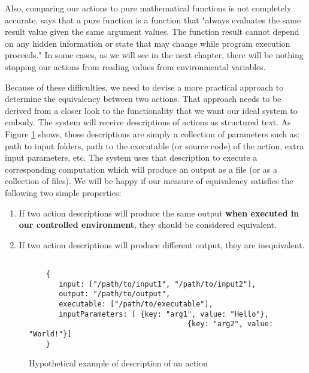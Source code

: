 Also, comparing our actions to pure mathematical functions is not completely accurate.  \cite{wiki:pure_function} says that a pure function is a function that "always evaluates the same result value given the same argument values.  The function result cannot depend on any hidden information or state that may change while program execution proceeds." In some cases, as we will see in the next chapter, there will be nothing stopping our actions from reading values from environmental variables.

Because of these difficulties, we need to devise a more practical approach to determine the equivalency between two actions.  That approach needs to be derived from a closer look to the functionality that we want our ideal system to embody.  The system will receive descriptions of actions as structured text.  As Figure \ref{fig:hypothetical_inputs} shows, those descriptions are simply a collection of parameters such as: path to input folders, path to the executable (or source code) of the action, extra input parameters, etc.  The system uses that description to execute a corresponding computation which will produce an output as a file (or as a collection of files). We will be happy if our measure of equivalency satisfies the following two simple properties:

\begin{enumerate}
\item If two action descriptions will produce the same output \textbf{when executed in our controlled environment}, they should be considered equivalent.
\item If two action descriptions will produce different output, they are inequivalent.
\end{enumerate}

\begin{figure}

\begin{mdframed}
\begin{verbatim}

	{
	   input: ["/path/to/input1", "/path/to/input2"],
	   output: "/path/to/output",
	   executable: ["/path/to/executable"],
	   inputParameters: [ {key: "arg1", value: "Hello"}, 
	                                 {key: "arg2", value: "World!"}]
	} 

\end{verbatim}
\end{mdframed}

\caption{Hypothetical example of description of an action}
\label{fig:hypothetical_inputs}
\end{figure} 


